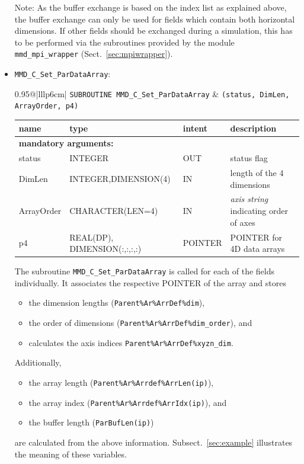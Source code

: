 \documentclass[twoside]{article}
\begin{document}
\begin{itemize}
Note: As the buffer exchange is based on the index list as explained above,
the buffer exchange can only be used for fields which contain both horizontal
dimensions. If other fields should be exchanged during a simulation, this has to
be performed via the subroutines provided by the module \verb|mmd_mpi_wrapper|
(Sect.\ \ref{sec:mpiwrapper}).


\item \verb|MMD_C_Set_ParDataArray|:\\
\vspace*{-0.3cm}

\begin{tabular*}{0.95\textwidth}{@{\extracolsep\fill}|lllp{6cm}|}
\hline
{}
{\tt SUBROUTINE MMD\_C\_Set\_ParDataArray} &
{\tt (status, DimLen, ArrayOrder, p4)}\\
\hline
\end{tabular*}
\begin{tabular*}{0.95\textwidth}{@{\extracolsep\fill}|lllp{6cm}|}
name & type & intent & description\\
\hline
\multicolumn{4}{|l|}{\bf mandatory arguments:}\\
status & {\footnotesize INTEGER} & OUT & status flag \\
DimLen & {\footnotesize INTEGER,DIMENSION(4)} & IN & length of the 4 dimensions \\
ArrayOrder & {\footnotesize CHARACTER(LEN=4)} & IN & {\it axis string} indicating order of axes \\
p4 & {\footnotesize REAL(DP), DIMENSION(:,:,:,:)}& {\footnotesize POINTER} & {\footnotesize POINTER} for 4D data arrays \\
\hline
\end{tabular*}
\smallskip
\vspace*{-0.3cm}

 The subroutine \verb|MMD_C_Set_ParDataArray| is called for each of the
 fields individually. It associates the respective {\footnotesize
 POINTER} of the array and stores 
\begin{itemize}
\item  the dimension lengths (\verb|Parent%Ar%ArrDef%dim|),
\item  the order of dimensions (\verb|Parent%Ar%ArrDef%dim_order|), and
\item  calculates the axis indices \verb|Parent%Ar%ArrDef%xyzn_dim|.
\end{itemize}
 Additionally,
\begin{itemize} 
\item the array length (\verb|Parent%Ar%Arrdef%ArrLen(ip)|),
\item  the array index (\verb|Parent%Ar%Arrdef%ArrIdx(ip)|), and 
\item the buffer length (\verb|ParBufLen(ip)|)
\end{itemize}
are calculated from the above information.
Subsect.\ \ref{sec:example} illustrates the meaning of these variables.


\end{itemize}
\end{document}
